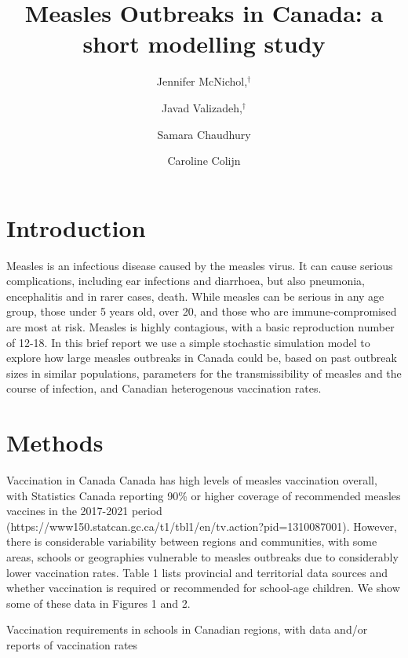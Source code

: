 \documentclass[12pt,a4paper]{article}
\begin{document}
\title{Measles Outbreaks in Canada: a short modelling study
}


\author[1]{Jennifer McNichol,$^\dag$}
\author[1]{Javad Valizadeh,$^\dag$}
\author[1]{Samara Chaudhury}
\author[1,*]{Caroline Colijn} 


\maketitle

\section{Introduction}

Measles is an infectious disease caused by the measles virus. It can cause serious complications, including ear infections and diarrhoea, but also pneumonia, encephalitis and in rarer cases, death. While measles can be serious in any age group, those under 5 years old, over 20, and those who are immune-compromised are most at risk. Measles is highly contagious, with a basic reproduction number of 12-18.  
In this brief report we use a simple stochastic simulation model to explore how large measles outbreaks in Canada could be, based on past outbreak sizes in similar populations, parameters for the transmissibility of measles and the course of infection, and Canadian heterogenous vaccination rates. 

\section{Methods}
Vaccination in Canada
Canada has high levels of measles vaccination overall, with Statistics Canada reporting 90\% or higher coverage of recommended measles vaccines in the 2017-2021 period (https://www150.statcan.gc.ca/t1/tbl1/en/tv.action?pid=1310087001). However, there is considerable variability between regions and communities, with some areas, schools or geographies vulnerable to measles outbreaks due to considerably lower vaccination rates. Table 1 lists provincial and territorial data sources and whether vaccination is required or recommended for school-age children. We show some of these data in Figures 1 and 2. 


\begin{table}
  \centering
  
  \caption[Vaccination requirements by province]{Vaccination requirements in schools in Canadian regions, with data and/or reports of vaccination rates}
  \label{tab:vaxrequire}
\end{table}
\end{document}

